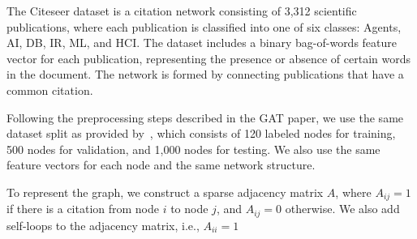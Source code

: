 The Citeseer dataset is a citation network consisting of 3,312 scientific publications, where each publication is classified into one of six classes: Agents, AI, DB, IR, ML, and HCI. The dataset includes a binary bag-of-words feature vector for each publication, representing the presence or absence of certain words in the document.
The network is formed by connecting publications that have a common citation.

Following the preprocessing steps described in the GAT paper, we use the same dataset split as provided by~\cite{sen2008collective}, which consists of 120 labeled nodes for training, 500 nodes for validation, and 1,000 nodes for testing.
We also use the same feature vectors for each node and the same network structure.

To represent the graph, we construct a sparse adjacency matrix $A$, where $A_{ij}=1$ if there is a citation from node $i$ to node $j$, and $A_{ij}=0$ otherwise.
We also add self-loops to the adjacency matrix, i.e., $A_{ii}=1$